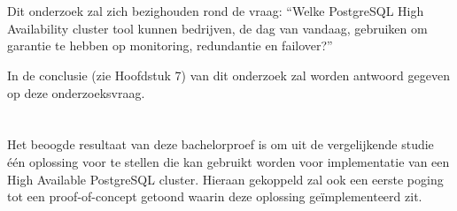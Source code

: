     \section{}
    \label{sec:onderzoeksvraag}
    
    \subsection{}
    \label{subsec:Hoofdonderzoeksvraag}
    
    Dit onderzoek zal zich bezighouden rond de vraag: “Welke PostgreSQL High Availability cluster tool kunnen bedrijven, de dag van vandaag, gebruiken om garantie te hebben op monitoring, redundantie en failover?”
    
    In de conclusie (zie Hoofdstuk 7) van dit onderzoek zal worden antwoord gegeven op deze onderzoeksvraag.
    \subsection{}
    \label{subsec:Deelonderzoeksvraag}
    
    
    \section{}
    \label{sec:onderzoeksdoelstelling}
    
    Het beoogde resultaat van deze bachelorproef is om uit de vergelijkende studie één oplossing voor te stellen die kan gebruikt worden voor implementatie van een High Available PostgreSQL cluster. Hieraan gekoppeld zal ook een eerste poging tot een proof-of-concept getoond waarin deze oplossing geïmplementeerd zit.
    
    
